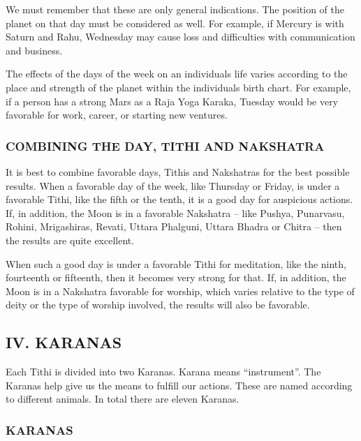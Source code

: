 \begin{enumerate}
We must remember that these are only general indications. The position of the planet on that day must be considered as well. For example, if Mercury is with Saturn and Rahu, Wednesday may cause loss and difficulties with communication and business.

 

The effects of the days of the week on an individuals life varies according to the place and strength of the planet within the individuals birth chart. For example, if a person has a strong Mars as a Raja Yoga Karaka, Tuesday would be very favorable for work, career, or starting new ventures.

 

\subsubsection{COMBINING THE DAY, TITHI AND NAKSHATRA}

It is best to combine favorable days, Tithis and Nakshatras for the best possible results. When a favorable day of the week, like Thursday or Friday, is under a favorable Tithi, like the fifth or the tenth, it is a good day for auspicious actions. If, in addition, the Moon is in a favorable Nakshatra – like Pushya, Punarvasu, Rohini, Mrigashiras, Revati, Uttara Phalguni, Uttara Bhadra or Chitra – then the results are quite excellent.

 

When such a good day is under a favorable Tithi for meditation, like the ninth, fourteenth or fifteenth, then it becomes very strong for that. If, in addition, the Moon is in a Nakshatra favorable for worship, which varies relative to the type of deity or the type of worship involved, the results will also be favorable.

 

\subsection{IV. KARANAS}


Each Tithi is divided into two Karanas. Karana means “instrument”. The Karanas help give us the means to fulfill our actions. These are named according to different animals. In total there are eleven Karanas.

 

\subsubsection{KARANAS}


\end{enumerate}
